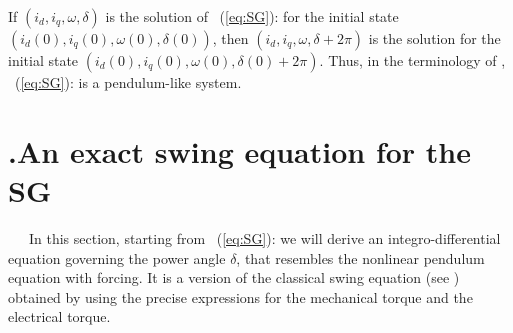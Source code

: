 \documentclass[12pt]{article}
\theoremstyle{definition}
\numberwithin{equation}{section}                        %
\newcommand{\rfb}[1]{\mbox{\rm
   (\ref{#1})}\ifx\undefined\stillediting\else:\fbox{$#1$}\fi}
\renewcommand{\o}    {{\omega}}
\newcommand{\secp}{{\hbox{\hskip -7mm.\hskip 4mm}}}
\let\oldlabel=\label
\renewcommand{\label}[1]{\leavevmode\smash{\raise 10pt\llap
             {\fbox{\scriptsize#1}}}\oldlabel{#1}}
\renewcommand{\label}[1]{\oldlabel{#1}}
\begin{document}
If $(i_d,i_q,\o,\delta)$ is the solution of \rfb{eq:SG} for the
initial state $(i_d(0),i_q(0),\o(0),\delta(0))$, then $(i_d,i_q,\o,
\delta+2\pi)$ is the solution for the initial state $(i_d(0),i_q(0),
\o(0),\delta(0)+2\pi)$. Thus, in the terminology of \cite[Definition
2.4.1]{LePoSm:96}, \rfb{eq:SG} is a pendulum-like system.

\section{\secp An exact swing equation for the SG} \label{sec4}

\ \ \ In this section, starting from \rfb{eq:SG} we will derive an
integro-differential equation governing the power angle $\delta$, that
resembles the nonlinear pendulum equation with forcing. It is a
version of the classical swing equation (see \cite{Kun:94,ZhOh:09})
obtained by using the precise expressions for the mechanical torque
and the electrical torque.
\end{document}
